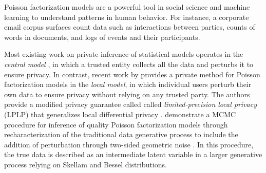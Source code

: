 \documentclass{article}
\begin{document}
  Poisson factorization models are a powerful tool in social science
  and machine learning to understand patterns in human behavior. For
  instance, a corporate email corpus surfaces count data such as
  interactions between parties, counts of words in documents, and logs
  of events and their participants. 


  

   Most
  existing work on  private inference of
  statistical models operates in the \emph{central model}
  \citep{park2016private,bernstein2018differentially}, in which a
  trusted entity collects all the data and perturbs it to ensure
  privacy. In contrast, recent work by \cite{schein2018locally}
  provides a private method for Poisson factorization models in the
  \emph{local model}, in which individual users perturb their own data
  to ensure privacy without relying on any trusted party. The authors
  provide a modified privacy guarantee called called
  \textit{limited-precision local privacy} (LPLP) that generalizes
  local differential privacy \citep{warner1965randomized}.
    \cite{schein2018locally} demonstrate
  a MCMC procedure for inference of quality Poisson factorization
  models through recharacterization of the traditional data generative
  process to include the addition of perturbation through two-sided
  geometric noise \citep{ghosh2012universally}.  In this procedure,
  the true data is described as an intermediate latent variable in a
  larger generative process relying on Skellam and Bessel
  distributions.
  
\end{document}
